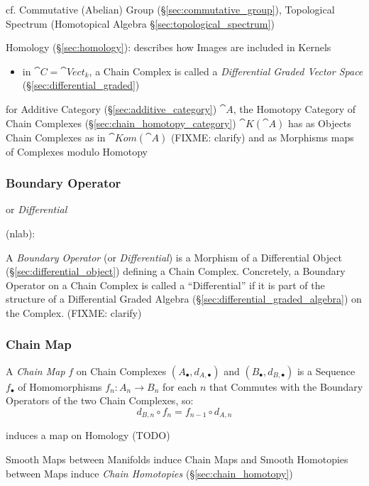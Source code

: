 \fist cf. Commutative (Abelian) Group (\S\ref{sec:commutative_group}),
Topological Spectrum (Homotopical Algebra \S\ref{sec:topological_spectrum})

\fist Homology (\S\ref{sec:homology}): describes how Images are included in
Kernels

\begin{itemize}
  \item in $\cat{C} = \cat{Vect}_k$, a Chain Complex is called a
    \emph{Differential Graded Vector Space} (\S\ref{sec:differential_graded})
\end{itemize}

\fist for Additive Category (\S\ref{sec:additive_category}) $\cat{A}$, the
Homotopy Category of Chain Complexes (\S\ref{sec:chain_homotopy_category})
$\cat{K}(\cat{A})$ has as Objects Chain Complexes as in $\cat{Kom}(\cat{A})$
(FIXME: clarify) and as Morphisms maps of Complexes modulo Homotopy



\subsubsection{Boundary Operator}\label{sec:boundary_operator}

or \emph{Differential}

(nlab):

A \emph{Boundary Operator} (or \emph{Differential}) is a Morphism of a
Differential Object (\S\ref{sec:differential_object}) defining a Chain Complex.
Concretely, a Boundary Operator on a Chain Complex is called a ``Differential''
if it is part of the structure of a Differential Graded Algebra
(\S\ref{sec:differential_graded_algebra}) on the Complex.
(FIXME: clarify)



\subsubsection{Chain Map}\label{sec:chain_map}

A \emph{Chain Map} $f$ on Chain Complexes $(A_\bullet, d_{A,\bullet})$ and
$(B_\bullet, d_{B,\bullet})$ is a Sequence $f_\bullet$ of Homomorphisms $f_n :
A_n \rightarrow B_n$ for each $n$ that Commutes with the Boundary Operators of
the two Chain Complexes, so:
\[
  d_{B,n} \circ f_n = f_{n-1} \circ d_{A,n}
\]

induces a map on Homology (TODO)

Smooth Maps between Manifolds induce Chain Maps and Smooth Homotopies between
Maps induce \emph{Chain Homotopies} (\S\ref{sec:chain_homotopy})



